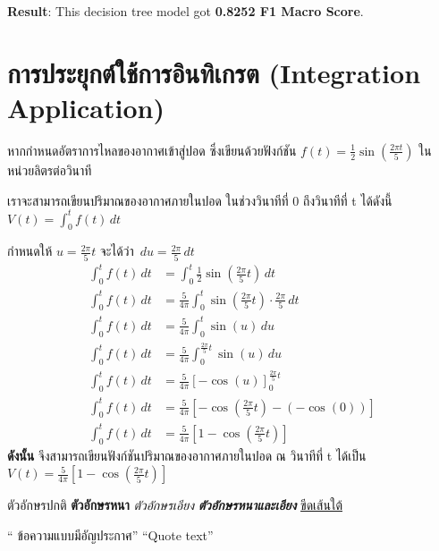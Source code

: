 \documentclass[12pt, a4paper]{article}
\begin{document}
        \noindent \textbf{Result}: This decision tree model got \textbf{0.8252 F1 Macro Score}.

    \pagebreak

    \section{การประยุกต์ใช้การอินทิเกรต (Integration Application)}
        หากกำหนดอัตราการไหลของอากาศเข้าสู่ปอด ซึ่งเขียนด้วยฟังก์ชัน $f(t) = \frac{1}{2}\sin\left( \frac{2 \pi t}{5} \right)$ ในหน่วยลิตรต่อวินาที

        \vspace{0.5em}

        \noindent เราจะสามารถเขียนปริมาณของอากาศภายในปอด ในช่วงวินาทีที่ 0 ถึงวินาทีที่ t ได้ดังนี้ $V(t) = \int_{0}^{t} f(t) \,dt$

        \vspace{0.5em}

        \noindent กำหนดให้ $u = \frac{2\pi}{5}t$ จะได้ว่า $\,du = \frac{2\pi}{5}\,dt$
        \begin{align*}
            \int_{0}^{t} f(t) \,dt &= \int_{0}^{t} \frac{1}{2} \sin \left( \frac{2\pi}{5}t \right) \,dt \\[1em]
            \int_{0}^{t} f(t) \,dt &= \frac{5}{4\pi} \int_{0}^{t} \sin \left( \frac{2\pi}{5}t \right) \cdot \frac{2\pi}{5} \,dt \\[1em]
            \int_{0}^{t} f(t) \,dt &= \frac{5}{4\pi} \int_{0}^{t} \sin(u) \,du \\[1em]
            \int_{0}^{t} f(t) \,dt &= \frac{5}{4\pi} \int_{0}^{\frac{2\pi}{5}t} \sin(u) \,du \\[1em]
            \int_{0}^{t} f(t) \,dt &= \frac{5}{4\pi} \left[ -\cos(u) \right]_{0}^{\frac{2\pi}{5}t} \\[1em]
            \int_{0}^{t} f(t) \,dt &= \frac{5}{4\pi} \left[ -\cos\left( \frac{2\pi}{5}t \right) - (-\cos(0)) \right] \\[1em]
            \int_{0}^{t} f(t) \,dt &= \frac{5}{4\pi} \left[ 1 -\cos\left( \frac{2\pi}{5}t \right) \right]
        \end{align*}
        \noindent \textbf{ดังนั้น} จึงสามารถเขียนฟังก์ชันปริมาณของอากาศภายในปอด ณ วินาทีที่ t ได้เป็น $V(t) = \frac{5}{4\pi} \left[ 1 -\cos\left( \frac{2\pi}{5}t \right) \right]$

        \vspace{0.5em}

        \noindent ตัวอักษรปกติ \textbf{ตัวอักษรหนา} \textit{ตัวอักษรเอียง} \textbf{\textit{ตัวอักษรหนาและเอียง}} \underline{ขีดเส้นใต้}

        \noindent \enquote{ ข้อความแบบมีอัญประกาศ} \enquote{Quote text}
\end{document}
